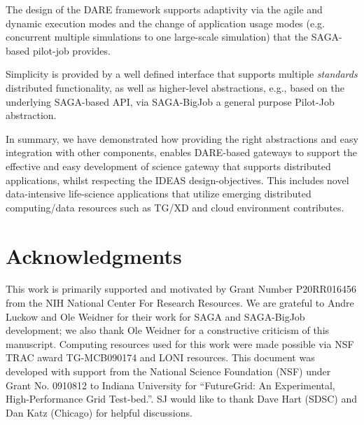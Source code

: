 \documentclass[]{article}
\begin{document}
The design of the DARE framework supports adaptivity via the agile and
dynamic execution modes and the change of application usage modes
(e.g. concurrent multiple simulations to one large-scale simulation)
that the SAGA-based pilot-job provides.



Simplicity is provided by a well defined interface that supports
multiple {\it standards} distributed functionality, as well as
higher-level abstractions, e.g., based on the underlying SAGA-based
API, via SAGA-BigJob a general purpose Pilot-Job abstraction.

In summary, we have demonstrated how providing the right abstractions
and easy integration with other components, enables DARE-based
gateways to support the effective and easy development of science
gateway that supports distributed applications, whilst respecting the
IDEAS design-objectives.  This includes novel data-intensive
life-science applications that utilize emerging distributed
computing/data resources such as TG/XD and cloud environment
contributes.



\section{Acknowledgments}
This work is primarily supported and motivated by Grant Number
P20RR016456 from the NIH National Center For Research Resources.  We
are grateful to Andre Luckow and Ole Weidner for their work for SAGA
and SAGA-BigJob development; we also thank Ole Weidner for a
constructive criticism of this manuscript.  Computing resources used
for this work were made possible via NSF TRAC award TG-MCB090174 and
LONI resources.  This document was developed with support from the
National Science Foundation (NSF) under Grant No.  0910812 to Indiana
University for ``FutureGrid: An Experimental, High-Performance Grid
Test-bed.''. SJ would like to thank Dave Hart (SDSC) and Dan Katz
(Chicago) for helpful discussions.

%

%

\end{document}
